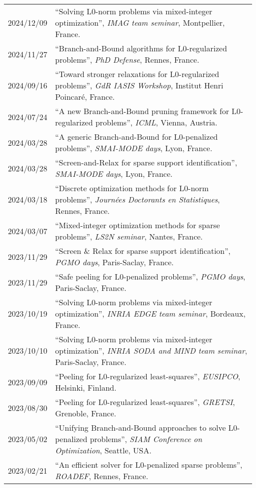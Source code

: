
\begin{longtable}[l]{@{}p{}p{}}
    2024/12/09 & ``Solving L0-norm problems via mixed-integer optimization'', \textit{IMAG team seminar}, Montpellier, France. \\
    2024/11/27 & ``Branch-and-Bound algorithms for L0-regularized problems'', \textit{PhD Defense}, Rennes, France. \\
    2024/09/16 & ``Toward stronger relaxations for L0-regularized problems'', \textit{GdR IASIS Workshop}, Institut Henri Poincaré, France. \\
    2024/07/24 & ``A new Branch-and-Bound pruning framework for L0-regularized problems'', \textit{ICML}, Vienna, Austria. \\
    2024/03/28 & ``A generic Branch-and-Bound for L0-penalized problems'', \textit{SMAI-MODE days}, Lyon, France. \\
    2024/03/28 & ``Screen-and-Relax for sparse support identification'', \textit{SMAI-MODE days}, Lyon, France. \\
    2024/03/18 & ``Discrete optimization methods for L0-norm problems'', \textit{Journées Doctorants en Statistiques}, Rennes, France. \\
    2024/03/07 & ``Mixed-integer optimization methods for sparse problems'', \textit{LS2N seminar}, Nantes, France. \\
    2023/11/29 & ``Screen \& Relax for sparse support identification'', \textit{PGMO days}, Paris-Saclay, France. \\
    2023/11/29 & ``Safe peeling for L0-penalized problems'', \textit{PGMO days}, Paris-Saclay, France. \\
    2023/10/19 & ``Solving L0-norm problems via mixed-integer optimization'', \textit{INRIA EDGE team seminar}, Bordeaux, France. \\
    2023/10/10 & ``Solving L0-norm problems via mixed-integer optimization'', \textit{INRIA SODA and MIND team seminar}, Paris-Saclay, France. \\
    2023/09/09 & ``Peeling for L0-regularized least-squares'', \textit{EUSIPCO}, Helsinki, Finland. \\
    2023/08/30 & ``Peeling for L0-regularized least-squares'', \textit{GRETSI}, Grenoble, France. \\
    2023/05/02 & ``Unifying Branch-and-Bound approaches to solve L0-penalized problems'', \textit{SIAM Conference on Optimization}, Seattle, USA. \\
    2023/02/21 & ``An efficient solver for L0-penalized sparse problems'', \textit{ROADEF}, Rennes, France. \\

\end{longtable}
